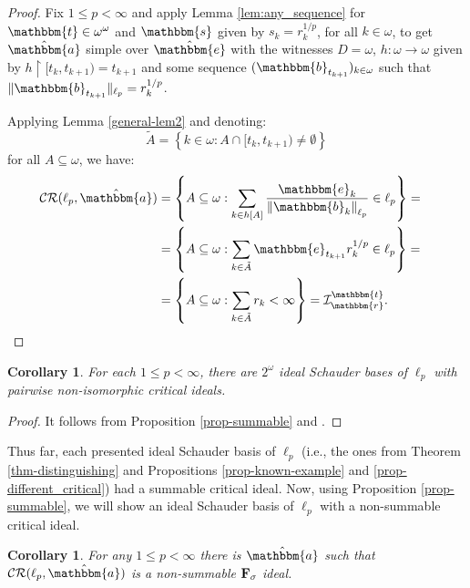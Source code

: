 \documentclass{amsart}
\newcommand{\I}{\mathcal{I}}
\newcommand{\CR}{\mathcal{CR}}
\newcommand{\w}{\mathbbm}
\newtheorem{corollary}[theorem]{Corollary}
\begin{document}
\begin{proof}
Fix $1\leq p<\infty$ and apply Lemma \ref{lem:any_sequence} for $\w{t}\in\omega^\omega$ and $\w{s}$ given by $s_k=r_k^{1/p}$, for all $k\in\omega$, to get $\hat{\w{a}}$ simple over $\hat{\w{e}}$ with the witnesses $D=\omega$, $h:\omega\to\omega$ given by $h\restriction[t_k,t_{k+1})=t_{k+1}$ and some sequence $(\w{b}_{t_{k+1}})_{k\in\omega}$ such that $\|\w{b}_{t_{k+1}}\|_{\ell_p}=r_k^{1/p}$.

Applying Lemma \ref{general-lem2} and denoting:
\[
\tilde{A}=\left\{k\in\omega:A\cap [t_k,t_{k+1})\neq\emptyset\right\}
\]
for all $A\subseteq\omega$, we have:
\begin{align*}
\CR(\ell_p,\hat{\w{a}}) & =\left\{A\subseteq\omega: \sum_{k\in h[A]}\frac{\w{e}_{k}}{\left\|\w{b}_k\right\|_{\ell_p}}\in \ell_p\right\}=\cr
& =\left\{A\subseteq\omega: \sum_{k\in \tilde{A}}\w{e}_{t_{k+1}}r_k^{1/p}\in \ell_p\right\}=\cr
& =\left\{A\subseteq\omega: \sum_{k\in \tilde{A}}r_k<\infty\right\}=\I^{\w{t}}_{\w{r}}.    
\end{align*}
\end{proof}

\begin{corollary}
For each $1\leq p<\infty$, there are $2^\omega$ ideal Schauder bases of $\ell_p$ with pairwise non-isomorphic critical ideals.
\end{corollary}

\begin{proof}
It follows from Proposition \ref{prop-summable} and \cite[Theorem 1]{MezaGuzman}.
\end{proof}

Thus far, each presented ideal Schauder basis of $\ell_p$ (i.e., the ones from Theorem \ref{thm-distinguishing} and Propositions \ref{prop-known-example} and \ref{prop-different_critical}) had a summable critical ideal. Now, using Proposition \ref{prop-summable}, we will show an ideal Schauder basis of $\ell_p$ with a non-summable critical ideal. 

\begin{corollary}
\label{cor:non-summable}
For any $1\leq p<\infty$ there is $\hat{\w{a}}$ such that $\CR(\ell_p,\hat{\w{a}})$ is a non-summable $\bf{F_\sigma}$ ideal. 
\end{corollary}
\end{document}
